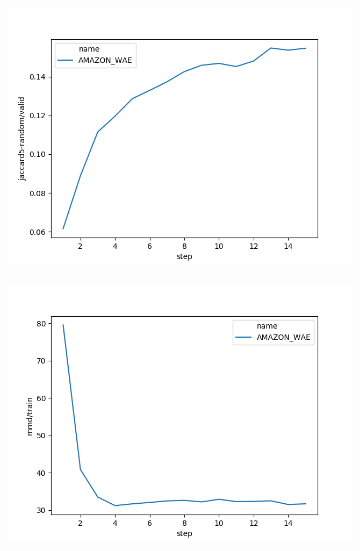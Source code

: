 \begin{figure}[h]
\begin{subfigure}{0.3\textheight}
		\caption{}
		\label{fig:chap4:amazon_latent_cls}
	\end{subfigure}
	\begin{subfigure}{0.3\textheight}
		\centering
		\includegraphics[width=1.\textwidth]{images/figs2/2020_01_15__11_37_34__jaccard5-random.png}
		\caption{}
		\label{fig:chap4:amazon_jaccard}
	\end{subfigure}
	\begin{subfigure}{0.3\textheight}
		\centering
		\includegraphics[width=1.\textwidth]{images/figs2/2020_01_15__11_37_33__mmd.png}
		\caption{}
		\label{fig:chap4:amazon_mmd}
	\end{subfigure}
	\begin{subfigure}{0.3\textheight}

\end{subfigure}
\end{figure}
